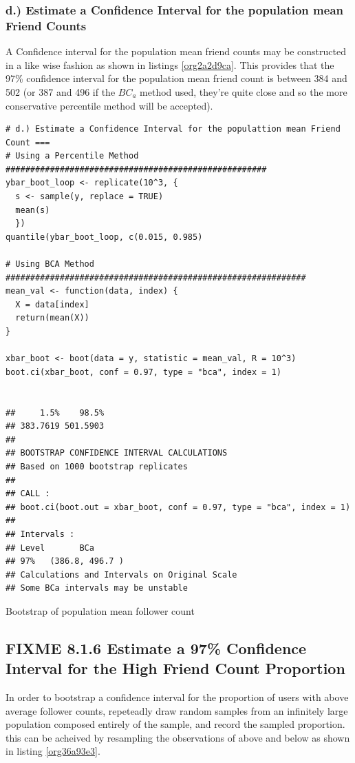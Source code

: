 \documentclass[11pt]{article}
\begin{document}
\subsubsection{d.) Estimate a Confidence Interval for the population mean Friend Counts}
\label{sec:orgd2afe56}
A Confidence interval for the population mean friend counts may be constructed in a like wise fashion as shown in listings \ref{org2a2d9ca}. This provides that the 97\% confidence interval for the population mean friend count is between 384 and 502 (or 387 and 496 if the \(BC_{a}\) method used, they're quite close and so the more conservative percentile method will be accepted).

\begin{listing}[htbp]
\begin{verbatim}
# d.) Estimate a Confidence Interval for the populattion mean Friend Count ===
# Using a Percentile Method #####################################################
ybar_boot_loop <- replicate(10^3, {
  s <- sample(y, replace = TRUE)
  mean(s)
  })
quantile(ybar_boot_loop, c(0.015, 0.985)

# Using BCA Method #############################################################
mean_val <- function(data, index) {
  X = data[index]
  return(mean(X))
}

xbar_boot <- boot(data = y, statistic = mean_val, R = 10^3)
boot.ci(xbar_boot, conf = 0.97, type = "bca", index = 1)


##     1.5%    98.5%
## 383.7619 501.5903
##
## BOOTSTRAP CONFIDENCE INTERVAL CALCULATIONS
## Based on 1000 bootstrap replicates
##
## CALL :
## boot.ci(boot.out = xbar_boot, conf = 0.97, type = "bca", index = 1)
##
## Intervals :
## Level       BCa
## 97%   (386.8, 496.7 )
## Calculations and Intervals on Original Scale
## Some BCa intervals may be unstable
\end{verbatim}
\caption{\label{org2a2d9ca}Bootstrap of population mean follower count}
\end{listing}

\subsection{{\bfseries\sffamily FIXME} 8.1.6 Estimate a 97\% Confidence Interval for the High Friend Count Proportion}
\label{sec:org98296c5}
In order to bootstrap a confidence interval for the proportion of users with
above average follower counts, repeteadly draw random samples from an infinitely
large population composed entirely of the sample, and record the sampled
proportion. this can be acheived by resampling the observations of above and
below as shown in listing \ref{org36a93e3}.
\end{document}
